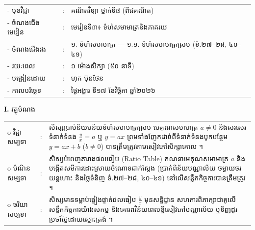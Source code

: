 \documentclass[a4paper,10pt]{article}
\newcommand{\wcirc}{{\CourierBullet\fontsize{9.5pt}{11pt}\selectfont o}}
\newcommand{\en}[1]{{\TimesEn #1}}
\begin{document}
{\renewcommand{\arraystretch}{0.98}
\hspace*{3.1cm}%
\begin{tabular}{@{}l l L{11.0cm}@{}}
  - \hspace{0.35cm} មុខវិជ្ជា & : & គណិតវិទ្យា ថ្នាក់ទី៨ (ពីជគណិត) \\
  - \hspace{0.35cm} ចំណងជើងមេរៀន & : & មេរៀនទី៣៖ ទំហំសមាមាត្រនិងភាគរយ \\
  - \hspace{0.35cm} ចំណងជើងរង & : & ១. ទំហំសមាមាត្រ — ១.១. ទំហំសមាមាត្រស្រប (ទំ.២៧–២៨, ៤០–៤១) \\
  - \hspace{0.35cm} រយៈពេល & : & ១ ម៉ោងសិក្សា (៥០ នាទី) \\
  - \hspace{0.35cm} បង្រៀនដោយ & : & ហុក ប៊ុនថែន \\
  - \hspace{0.35cm} កាលបរិច្ឆេទ & : & ថ្ងៃអង្គារ ទី១៧ ខែវិច្ឆិកា ឆ្នាំ២០២៦ \\
\end{tabular}

\vspace{2pt}

\textbf{I.} {\muol វត្ថុបំណង}\\[1pt]
\hspace*{0.55cm}%
\begin{tabular}{@{}l l L{14.2cm}@{}}
  \wcirc \hspace{0.25cm} វិជ្ជាសម្បទា & : & សិស្សប្រាប់និយមន័យទំហំសមាមាត្រស្រប មេគុណសមាមាត្រ $a \neq 0$ និងសរសេរទំនាក់ទំនង $\frac{y}{x} = a$ ឬ $y = ax$ ព្រមទាំងញែកដាច់ពីទំនាក់ទំនងបូកបន្ថែម $y = ax + b$ ($b\neq 0$) បានត្រឹមត្រូវតាមសៀវភៅសិក្សាគោល ។ \\
  \wcirc \hspace{0.25cm} បំណិនសម្បទា & : & សិស្សបំពេញតារាងផលធៀប (\en{Ratio Table}) គណនាមេគុណសមាមាត្រ $a$ និងបង្កើតសមីការដោះស្រាយចំណោទជាក់ស្ដែង (ប្រាក់ពិន័យបណ្ណាល័យ ចម្ងាយចរយន្តហោះ និងថ្លៃទំនិញ ទំ.២៧–២៨, ៤០–៤១) នៅលើសន្លឹកកិច្ចការបានត្រឹមត្រូវ ។ \\
  \wcirc \hspace{0.25cm} ចរិយាសម្បទា & : & សិស្សមានទម្លាប់ផ្ទៀងផ្ទាត់ផលធៀប $\frac{y}{x}$ មុនសន្និដ្ឋាន សហការពិភាក្សាជាគូលើសន្លឹកកិច្ចការយ៉ាងសកម្ម និងគោរពវិន័យពេលខ្ចីសៀវភៅបណ្ណាល័យ ឬទិញដូរប្រចាំថ្ងៃដោយស្មោះត្រង់ ។ \\
\end{tabular}

}
\end{document}
